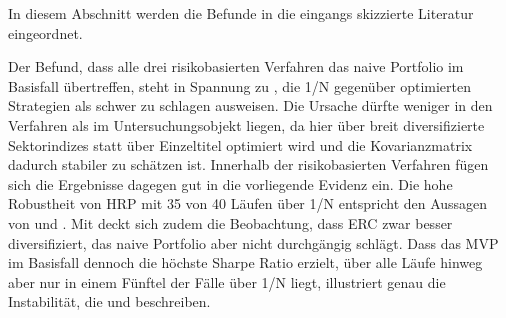 \documentclass[12pt,a4paper]{article}
\begin{document}
In diesem Abschnitt werden die Befunde in die eingangs skizzierte Literatur eingeordnet.

Der Befund, dass alle drei risikobasierten Verfahren das naive Portfolio im Basisfall übertreffen, steht in Spannung zu \textcite{demiguel2009}, die 1/N gegenüber optimierten Strategien als schwer zu schlagen ausweisen.
Die Ursache dürfte weniger in den Verfahren als im Untersuchungsobjekt liegen, da hier über breit diversifizierte Sektorindizes statt über Einzeltitel optimiert wird und die Kovarianzmatrix dadurch stabiler zu schätzen ist.
Innerhalb der risikobasierten Verfahren fügen sich die Ergebnisse dagegen gut in die vorliegende Evidenz ein.
Die hohe Robustheit von HRP mit 35 von 40 Läufen über 1/N entspricht den Aussagen von \textcite{deprado2016} und \textcite{sen2022}.
Mit \textcite{chaves2011} deckt sich zudem die Beobachtung, dass ERC zwar besser diversifiziert, das naive Portfolio aber nicht durchgängig schlägt.
Dass das MVP im Basisfall dennoch die höchste Sharpe Ratio erzielt, über alle Läufe hinweg aber nur in einem Fünftel der Fälle über 1/N liegt, illustriert genau die Instabilität, die \textcite{lee2011} und \textcite{behr2008} beschreiben.
\end{document}
